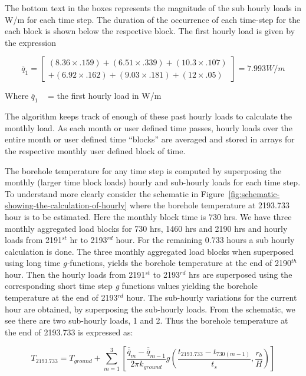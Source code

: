 The bottom text in the boxes represents the magnitude of the sub hourly loads in W/m for each time step. The duration of the occurrence of each time-step for the each block is shown below the respective block. The first hourly load is given by the expression

\begin{equation}
{\overline q_1} = \left[ \begin{array}{l}\left( {8.36 \times .159} \right) + \left( {6.51 \times .339} \right) + \left( {10.3 \times .107} \right)\\ + \left( {6.92 \times .162} \right) + \left( {9.03 \times .181} \right) + \left( {12 \times .05} \right)\end{array} \right] = 7.993W/m
\end{equation}

Where \({\overline q_1}\) ~ = the first hourly load in W/m

The algorithm keeps track of enough of these past hourly loads to calculate the monthly load. As each month or user defined time passes, hourly loads over the entire month or user defined time ``blocks'' are averaged and stored in arrays for the respective monthly user defined block of time.

The borehole temperature for any time step is computed by superposing the monthly (larger time block loads) hourly and sub-hourly loads for each time step. To understand more clearly consider the schematic in Figure~\ref{fig:schematic-showing-the-calculation-of-hourly} where the borehole temperature at 2193.733 hour is to be estimated. Here the monthly block time is 730 hrs. We have three monthly aggregated load blocks for 730 hrs, 1460 hrs and 2190 hrs and hourly loads from 2191\(^{st}\) hr to 2193\(^{rd}\) hour. For the remaining 0.733 hours a sub hourly calculation is done. The three monthly aggregated load blocks when superposed using long time \emph{g-}functions, yields the borehole temperature at the end of 2190\(^{th}\) hour. Then the hourly loads from 2191\(^{st}\) to 2193\(^{rd}\) hrs are superposed using the corresponding short time step \emph{g} functions values yielding the borehole temperature at the end of 2193\(^{rd}\) hour. The sub-hourly variations for the current hour are obtained, by superposing the sub-hourly loads. From the schematic, we see there are two sub-hourly loads, 1 and 2. Thus the borehole temperature at the end of 2193.733 is expressed as:

\begin{equation}
{T_{2193.733}} = {T_{ground}} + \sum\limits_{m = 1}^3 {\left[ {\frac{{{{\overline{\overline q} }_m} - {{\overline{\overline q} }_{m - 1}}}}{{2\pi {k_{ground}}}}g\left( {\frac{{{t_{2193.733}} - {t_{730(m - 1)}}}}{{{t_s}}},\frac{{{r_b}}}{H}} \right)} \right]}
\end{equation}

